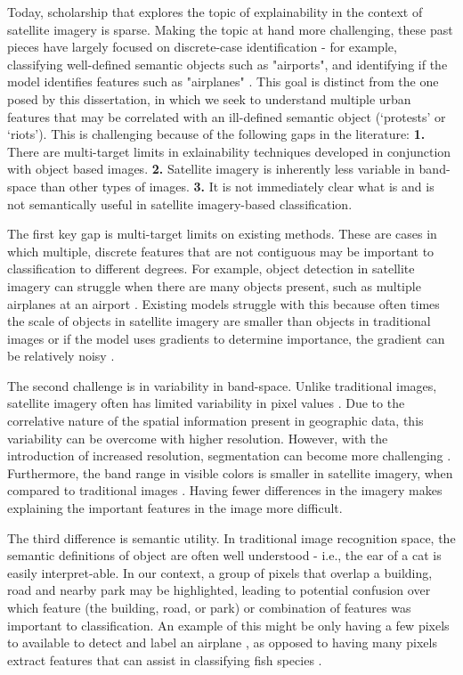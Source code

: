 Today, scholarship that explores the topic of explainability in the context of satellite imagery is sparse. Making the topic at hand more challenging, these past pieces have largely focused on discrete-case identification - for example, classifying well-defined semantic objects such as "airports", and identifying if the model identifies features such as "airplanes" \citep{vasu2018aerial,charuchinda2019use,fu2019multicam}.  This goal is distinct from the one posed by this dissertation, in which we seek to understand multiple urban features that may be correlated with an ill-defined semantic object (`protests' or `riots'). This is challenging because of the following gaps in the literature:
\textbf{1.} There are multi-target limits in exlainability techniques developed in conjunction with object based images.
\textbf{2.} Satellite imagery is inherently less variable in band-space than other types of images.
\textbf{3.} It is not immediately clear what is and is not semantically useful in satellite imagery-based classification.

The first key gap is multi-target limits on existing methods.  These are cases in which multiple, discrete features that are not contiguous may be important to classification to different degrees.  For example, object detection in satellite imagery can struggle when there are many objects present, such as multiple airplanes at an airport \citep{tahir2022automatic}.  Existing models struggle with this because often times the scale of objects in satellite imagery are smaller than objects in traditional images \citep{tahir2022automatic} or if the model uses gradients to determine importance, the gradient can be relatively noisy \citep{wang2020score}.

The second challenge is in variability in band-space.  Unlike traditional images, satellite imagery often has limited variability in pixel values \citep{carleer2005assessment}.  Due to the correlative nature of the spatial information present in geographic data, this variability can be overcome with higher resolution. However, with the introduction of increased resolution, segmentation can become more challenging \citep{carleer2005assessment}.  Furthermore, the band range in visible colors is smaller in satellite imagery, when compared to traditional images \citep{brewer2022susceptibility}.  Having fewer differences in the imagery makes explaining the important features in the image more difficult.

The third difference is semantic utility.  In traditional image recognition space, the semantic definitions of object are often well understood - i.e., the ear of a cat is easily interpret-able.  In our context, a group of pixels that overlap a building, road and nearby park may be highlighted, leading to potential confusion over which feature (the building, road, or park) or combination of features was important to classification.  An example of this might be only having a few pixels to available to detect and label an airplane \citep{tahir2022automatic}, as opposed to having many pixels extract features that can assist in classifying fish species \citep{rodrigues2010automatic}. 



